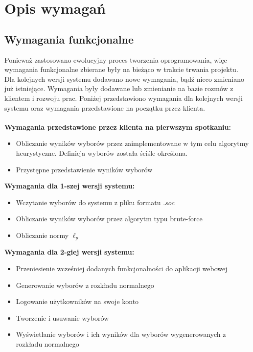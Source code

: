 \documentclass[pdflatex,11pt]{../aghdoc_version2}
\begin{document}
\section{Opis wymagań}
\subsection{Wymagania funkcjonalne}
Ponieważ zastosowano ewolucyjny proces tworzenia oprogramowania, więc wymagania
funkcjonalne zbierane były na bieżąco w trakcie trwania projektu. Dla kolejnych wersji
systemu dodawano nowe wymagania, bądź nieco zmieniano już istniejące. Wymagania były
dodawane lub zmienianie na bazie rozmów z klientem i rozwoju prac. Poniżej przedstawiono
wymagania dla kolejnych wersji systemu oraz wymagania przedstawione na początku przez
klienta. \\ \\
\textbf{Wymagania przedstawione przez klienta na pierwszym spotkaniu:}
\begin{itemize}
\item Obliczanie wyników wyborów przez zaimplementowane w tym celu algorytmy
heurystyczne. Definicja wyborów została ściśle określona.
\item Przystępne przedstawienie wyników wyborów
\end{itemize}
\vspace{\baselineskip}
\textbf{Wymagania dla 1-szej wersji systemu:}
\begin{itemize}
\item Wczytanie wyborów do systemu z pliku formatu $.soc$
\item Obliczanie wyników wyborów przez algorytm typu brute-force
\item Obliczanie normy $\ell_p$
\end{itemize}
\vspace{\baselineskip}
\textbf{Wymagania dla 2-giej wersji systemu:}
\begin{itemize}
\item Przeniesienie wcześniej dodanych funkcjonalności do aplikacji webowej
\item Generowanie wyborów z rozkładu normalnego
\item Logowanie użytkowników na swoje konto
\item Tworzenie i usuwanie wyborów
\item Wyświetlanie wyborów i ich wyników dla wyborów wygenerowanych z rozkładu
normalnego
\end{itemize}
\vspace{\baselineskip}
\end{document}
